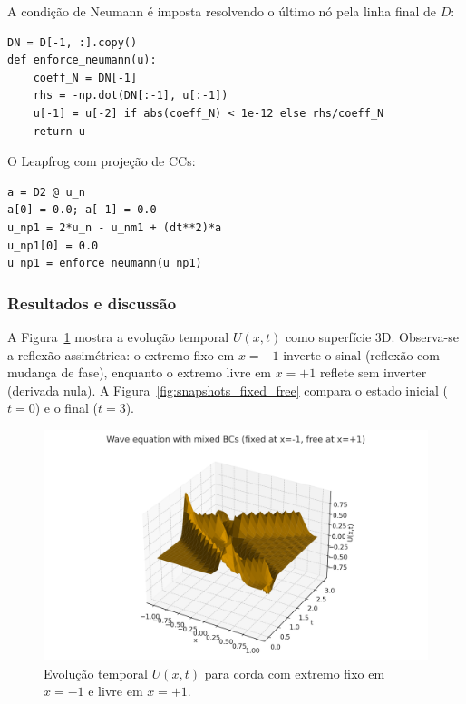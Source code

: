 \documentclass[12pt,a4paper]{article}
\begin{document}
A condição de Neumann é imposta resolvendo o último nó pela linha final de \(D\):
\begin{verbatim}
DN = D[-1, :].copy()
def enforce_neumann(u):
    coeff_N = DN[-1]
    rhs = -np.dot(DN[:-1], u[:-1])
    u[-1] = u[-2] if abs(coeff_N) < 1e-12 else rhs/coeff_N
    return u
\end{verbatim}

O Leapfrog com projeção de CCs:
\begin{verbatim}
a = D2 @ u_n
a[0] = 0.0; a[-1] = 0.0
u_np1 = 2*u_n - u_nm1 + (dt**2)*a
u_np1[0] = 0.0
u_np1 = enforce_neumann(u_np1)
\end{verbatim}

\subsubsection{Resultados e discussão}
A Figura~\ref{fig:timeline_fixed_free} mostra a evolução temporal \(U(x,t)\) como superfície 3D. Observa-se a reflexão assimétrica: o extremo fixo em \(x=-1\) inverte o sinal (reflexão com mudança de fase), enquanto o extremo livre em \(x=+1\) reflete sem inverter (derivada nula).
A Figura~\ref{fig:snapshots_fixed_free} compara o estado inicial (\(t=0\)) e o final (\(t=3\)).

\begin{figure}[H]
  \centering
  \includegraphics[width=0.95\linewidth]{figures/wave_fixed_free_timeline.png}
  \caption{Evolução temporal \(U(x,t)\) para corda com extremo fixo em \(x=-1\) e livre em \(x=+1\).}
  \label{fig:timeline_fixed_free}
\end{figure}
\end{document}
